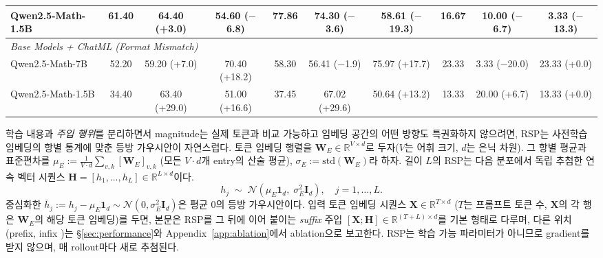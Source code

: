 \begin{table}[!t]
{\begin{tabular}{l ccc ccc ccc}
Qwen2.5-Math-1.5B      & 61.40 & \cellcolor{blue!10}64.40 {\scriptsize(+3.0)}    & \cellcolor{blue!10}54.60 {\scriptsize($-$6.8)}  & 77.86 & \cellcolor{blue!10}74.30 {\scriptsize($-$3.6)}  & \cellcolor{blue!10}58.61 {\scriptsize($-$19.3)} & 16.67 & \cellcolor{blue!10}10.00 {\scriptsize($-$6.7)}  & \cellcolor{blue!10}3.33  {\scriptsize($-$13.3)} \\
\midrule
\multicolumn{10}{l}{\textit{Base Models + ChatML (Format Mismatch)}} \\
\midrule
Qwen2.5-Math-7B        & 52.20 & \cellcolor{blue!10}59.20 {\scriptsize(+7.0)}    & \cellcolor{blue!10}70.40 {\scriptsize(+18.2)}   & 58.30 & \cellcolor{blue!10}56.41 {\scriptsize($-$1.9)}  & \cellcolor{blue!10}75.97 {\scriptsize(+17.7)} & 23.33 & \cellcolor{blue!10}3.33  {\scriptsize($-$20.0)} & \cellcolor{blue!10}23.33 {\scriptsize(+0.0)}  \\
Qwen2.5-Math-1.5B      & 34.40 & \cellcolor{blue!10}63.40 {\scriptsize(+29.0)}   & \cellcolor{blue!10}51.00 {\scriptsize(+16.6)}   & 37.45 & \cellcolor{blue!10}67.02 {\scriptsize(+29.6)}   & \cellcolor{blue!10}50.64 {\scriptsize(+13.2)} & 13.33 & \cellcolor{blue!10}20.00 {\scriptsize(+6.7)}    & \cellcolor{blue!10}13.33 {\scriptsize(+0.0)}  \\
\bottomrule
\end{tabular}}
\end{table}

학습 내용과 \emph{주입 행위}를 분리하면서 magnitude는 실제 토큰과 비교 가능하고 임베딩 공간의 어떤 방향도 특권화하지 않으려면, RSP는 사전학습 임베딩의 항별 통계에 맞춘 등방 가우시안이 자연스럽다. 토큰 임베딩 행렬을 $\mathbf{W}_E \in \mathbb{R}^{V\times d}$로 두자($V$는 어휘 크기, $d$는 은닉 차원). 그 항별 평균과 표준편차를 $\mu_E := \frac{1}{V\cdot d}\sum_{v,k}[\mathbf{W}_E]_{v,k}$ (모든 $V\cdot d$개 entry의 산술 평균), $\sigma_E := \mathrm{std}(\mathbf{W}_E)$라 하자. 길이 $L$의 RSP는 다음 분포에서 독립 추첨한 연속 벡터 시퀀스 $\mathbf{H} = [h_1,\dots,h_L]\in\mathbb{R}^{L\times d}$이다.
\begin{equation}\label{eq:rsp_def}
h_j \;\sim\; \mathcal{N}(\mu_E\mathbf{1}_d,\;\sigma_E^2\mathbf{I}_d), \quad j=1,\dots,L.
\end{equation}
중심화한 $\bar h_j := h_j - \mu_E\mathbf{1}_d \sim \mathcal{N}(0,\sigma_E^2\mathbf{I}_d)$은 평균 0의 등방 가우시안이다. 입력 토큰 임베딩 시퀀스 $\mathbf{X} \in \mathbb{R}^{T\times d}$ ($T$는 프롬프트 토큰 수, $\mathbf{X}$의 각 행은 $\mathbf{W}_E$의 해당 토큰 임베딩)를 두면, 본문은 RSP를 그 뒤에 이어 붙이는 \emph{suffix} 주입 $[\mathbf{X};\mathbf{H}] \in \mathbb{R}^{(T+L)\times d}$를 기본 형태로 다루며, 다른 위치(prefix, infix \citep{kang2025model, xu2025softcot, ye2025thinking, zhang2025memgen})는 \S\ref{sec:performance}와 Appendix~\ref{app:ablation}에서 ablation으로 보고한다. RSP는 학습 가능 파라미터가 아니므로 gradient를 받지 않으며, 매 rollout마다 새로 추첨된다.

